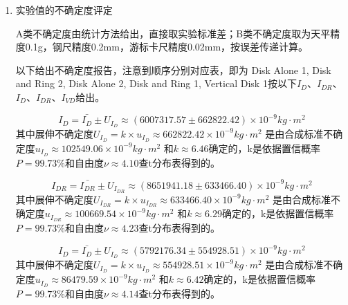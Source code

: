 \documentclass[dvipsnames, svgnames,a4paper,11pt]{article}
\begin{document}
\begin{enumerate}
		\begin{equation*}
			I_R=\bar{I_R}\pm U_{I_R}\approx( 4953384.58 \pm  34385.5 )\times10^{-9}kg\cdot m^2
		\end{equation*} 
		其中展伸不确定度$U_{I_R}={k}\times{u_{I_R}}\approx 34385.50 \times10^{-9}kg\cdot m^2$ 是由合成标准不确定度$u_{I_R}\approx 5396.63 \times10^{-9}kg\cdot m^2$ 和$k\approx6.13$确定的，k是依据置信概率$P=99.73\%$和自由度$\nu\approx4.35$查t分布表得到的。
		
		\begin{equation*}
			I_{VD}=\bar{I_{VD}}\pm U_{I_{VD}}\approx( 4552419.83 \pm  46631.03 )\times10^{-9}kg\cdot m^2
		\end{equation*} 
		其中展伸不确定度$U_{I_{VD}}={k}\times{u_{I_{VD}}}\approx 46631.03 \times10^{-9}kg\cdot m^2$ 是由合成标准不确定度$u_{I_{VD}}\approx 7043.96 \times10^{-9}kg\cdot m^2$ 和$k\approx6.62$确定的，k是依据置信概率$P=99.73\%$和自由度$\nu\approx4.00$查t分布表得到的。
		
		\item 实验值的不确定度评定
		
		A类不确定度由统计方法给出，直接取实验标准差；B类不确定度取为天平精度0.1g，钢尺精度0.2mm，游标卡尺精度0.02mm，按误差传递计算。
		
		以下给出不确定度报告，注意到顺序分别对应表，即为 Disk Alone 1, Disk and Ring 2, Disk Alone 2, Disk and Ring 1, Vertical Disk 1按以下$I_D$、$I_{DR}$、$I_D$、$I_{DR}$、$I_{VD}$给出。
		
		\begin{equation*}
			I_D=\bar{I_D}\pm U_{I_D}\approx( 6007317.57 \pm  662822.42 )\times10^{-9}kg\cdot m^2
		\end{equation*} 
		其中展伸不确定度$U_{I_D}={k}\times{u_{I_D}}\approx 662822.42 \times10^{-9}kg\cdot m^2$ 是由合成标准不确定度$u_{I_D}\approx 102549.06 \times10^{-9}kg\cdot m^2$ 和$k\approx6.46$确定的，k是依据置信概率$P=99.73\%$和自由度$\nu\approx4.10$查t分布表得到的。
		
		\begin{equation*}
			I_{DR}=\bar{I_{DR}}\pm U_{I_{DR}}\approx( 8651941.18 \pm  633466.40 )\times10^{-9}kg\cdot m^2
		\end{equation*} 
		其中展伸不确定度$U_{I_{DR}}={k}\times{u_{I_{DR}}}\approx 633466.40 \times10^{-9}kg\cdot m^2$ 是由合成标准不确定度$u_{I_{DR}}\approx 100669.54 \times10^{-9}kg\cdot m^2$ 和$k\approx6.29$确定的，k是依据置信概率$P=99.73\%$和自由度$\nu\approx4.23$查t分布表得到的。
		
		\begin{equation*}
			I_D=\bar{I_D}\pm U_{I_D}\approx( 5792176.34 \pm  554928.51 )\times10^{-9}kg\cdot m^2
		\end{equation*} 
		其中展伸不确定度$U_{I_D}={k}\times{u_{I_D}}\approx 554928.51 \times10^{-9}kg\cdot m^2$ 是由合成标准不确定度$u_{I_D}\approx 86479.59 \times10^{-9}kg\cdot m^2$ 和$k\approx6.42$确定的，k是依据置信概率$P=99.73\%$和自由度$\nu\approx4.14$查t分布表得到的。
		

\end{enumerate}
\end{document}
